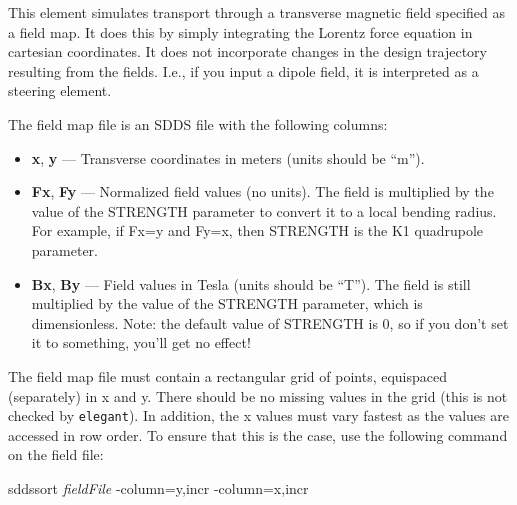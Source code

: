 This element simulates transport through a transverse magnetic field
specified as a field map.  It does this by simply integrating the
Lorentz force equation in cartesian coordinates.  It does not
incorporate changes in the design trajectory resulting from the
fields.  I.e., if you input a dipole field, it is interpreted as a
steering element.

The field map file is an SDDS file with the following columns:
\begin{itemize}
\item {\bf x}, {\bf y} --- Transverse coordinates in meters (units should be ``m'').
\item {\bf Fx}, {\bf Fy} --- Normalized field values (no units).  The
        field is multiplied by the value of the STRENGTH parameter to convert it to a 
        local bending radius.  For example, if Fx=y and Fy=x, then STRENGTH is the
        K1 quadrupole parameter.
\item {\bf Bx}, {\bf By} --- Field values in Tesla (units should be ``T'').
        The field is still multiplied by the value of the STRENGTH parameter, which
        is dimensionless.  Note: the default value of STRENGTH is 0, so if you don't
        set it to something, you'll get no effect!
\end{itemize}

The field map file must contain a rectangular grid of points,
equispaced (separately) in x and y.  There should be no missing values
in the grid (this is not checked by {\tt elegant}).  In addition, the
x values must vary fastest as the values are accessed in row order.
To ensure that this is the case, use the following command on the field
file:
\begin{flushleft}
sddssort {\em fieldFile} -column=y,incr -column=x,incr
\end{flushleft}


